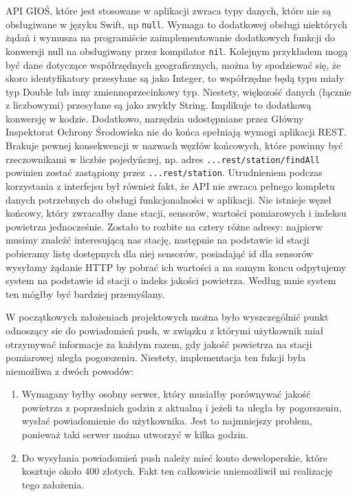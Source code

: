 \documentclass[a4paper,11pt,titlepage]{article}
\begin{document}
API GIOŚ, które jest stosowane w aplikacji zwraca typy danych, które nie są obsługiwane w języku Swift, np \verb|null|. Wymaga to dodatkowej obsługi niektórych żądań i wymusza na programiście zaimplementowanie dodatkowych funkcji do konwersji null na obsługiwany przez kompilator \verb|nil|. Kolejnym przykładem mogą być dane dotyczące współrzędnych geograficznych, można by spodziewać się, że skoro identyfikatory przesyłane są jako Integer, to współrzędne będą typu miały typ Double lub inny zmiennoprzecinkowy typ. Niestety, większość danych (łącznie z liczbowymi) przesyłane są jako zwykły String. Implikuje to dodatkową konwersję w kodzie. Dodatkowo, narzędzia udostępniane przez Główny Inspektorat Ochrony Środowiska nie do końca spełniają wymogi aplikacji REST. Brakuje pewnej konsekwencji w nazwach węzłów końcowych, które powinny być rzeczownikami w liczbie pojedyńczej, np. adres \verb|...rest/station/findAll| powinien zostać zastąpiony przez \verb|...rest/station|. Utrudnieniem podczas korzystania z interfejsu był również fakt, że API nie zwraca pełnego kompletu danych potrzebnych do obsługi funkcjonalności w aplikacji. Nie istnieje węzeł końcowy, który zwracałby dane stacji, sensorów, wartości pomiarowych i indeksu powietrza jednocześnie. Zostało to rozbite na cztery różne adresy: najpierw musimy znaleźć interesującą nas stację, następnie na podstawie id stacji pobieramy listę dostępnych dla niej sensorów, posiadająć id dla sensorów wysyłamy żądanie HTTP by pobrać ich wartości a na samym koncu odpytujemy system na podstawie id stacji o indeks jakości powietrza. Według mnie system ten mógłby być bardziej przemyślany.


W początkowych założeniach projektowych można było wyszczególnić punkt odnoszący sie do powiadomień push, w związku z którymi użytkownik miał otrzymywać informacje za każdym razem, gdy jakość powietrza na stacji pomiarowej uległa pogorszeniu. Niestety, implementacja ten fukcji była niemożliwa z dwóch powodów:
\begin{enumerate}
	\item Wymagany byłby osobny serwer, który musiałby porównywać jakość powietrza z poprzednich godzin z aktualną i jeżeli ta uległa by pogorszeniu, wysłać powiadomienie do użytkownika. Jest to najmniejszy problem, ponieważ taki serwer można utworzyć w kilka godzin.
	\item Do wysyłania powiadomień push należy mieć konto deweloperskie, które kosztuje około 400 złotych. Fakt ten całkowicie uniemożliwił mi realizację tego założenia.
\end{enumerate}
\end{document}
